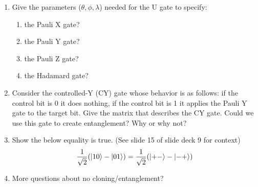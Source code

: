 \documentclass[12pt]{article}
\begin{document}
\begin{enumerate}[font=\bfseries]
    \item Give the parameters ($\theta,\phi,\lambda$) needed for the U gate to specify:
        \begin{enumerate}
            \item the Pauli X gate?
            \item the Pauli Y gate?
            \item the Pauli Z gate?
            \item the Hadamard gate?
        \end{enumerate}
    \item Consider the controlled-Y (CY) gate whose behavior is as follows: if the control bit is 0 it does nothing, if the control bit is 1 it applies the Pauli Y gate to the target bit. Give the matrix that describes the CY gate. Could we use this gate to create entanglement? Why or why not?
    \item Show the below equality is true. (See slide 15 of slide deck 9 for context)
    \[\frac{1}{\sqrt{2}}(\ket{10} - \ket{01}) = \frac{1}{\sqrt{2}}(\ket{+-} - \ket{-+})\]
    \item More questions about no cloning/entanglement?
\end{enumerate}
\end{document}
